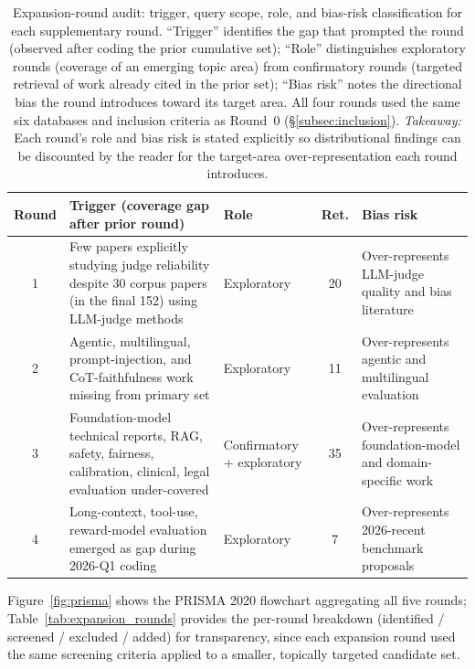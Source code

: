 \documentclass[acmsmall, nonacm, screen]{acmart}
\begin{document}
\begin{table}[!t]
\caption{Expansion-round audit: trigger, query scope, role, and
bias-risk classification for each supplementary round. ``Trigger''
identifies the gap that prompted the round (observed after coding
the prior cumulative set); ``Role'' distinguishes exploratory rounds
(coverage of an emerging topic area) from confirmatory rounds
(targeted retrieval of work already cited in the prior set);
``Bias risk'' notes the directional bias the round introduces toward
its target area. All four rounds used the same six databases and
inclusion criteria as Round~0 (§\ref{subsec:inclusion}).
\textit{Takeaway:} Each round's role and bias risk is stated
explicitly so distributional findings can be discounted by the reader
for the target-area over-representation each round introduces.}
\label{tab:expansion_audit}
\centering
\scriptsize
\setlength{\tabcolsep}{4pt}
\begin{tabular}{c p{3.8cm} p{2.8cm} c p{3.3cm}}
\toprule
\textbf{Round} & \textbf{Trigger (coverage gap after prior round)} & \textbf{Role} & \textbf{Ret.} & \textbf{Bias risk} \\
\midrule
1 & Few papers explicitly studying judge reliability despite 30 corpus papers (in the final 152) using LLM-judge methods & Exploratory & 20 & Over-represents LLM-judge quality and bias literature \\
2 & Agentic, multilingual, prompt-injection, and CoT-faithfulness work missing from primary set & Exploratory & 11 & Over-represents agentic and multilingual evaluation \\
3 & Foundation-model technical reports, RAG, safety, fairness, calibration, clinical, legal evaluation under-covered & Confirmatory + exploratory & 35 & Over-represents foundation-model and domain-specific work \\
4 & Long-context, tool-use, reward-model evaluation emerged as gap during 2026-Q1 coding & Exploratory & 7 & Over-represents 2026-recent benchmark proposals \\
\bottomrule
\end{tabular}
\end{table}

Figure~\ref{fig:prisma} shows the PRISMA 2020 flowchart aggregating
all five rounds; Table~\ref{tab:expansion_rounds} provides the
per-round breakdown (identified / screened / excluded / added)
for transparency, since each expansion round used the same
screening criteria applied to a smaller, topically targeted
candidate set.
\end{document}

